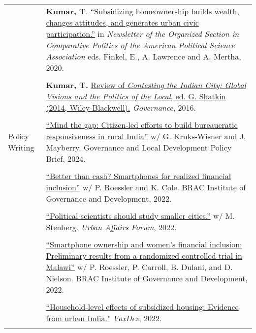 \documentclass[letterpaper, 10.5pt]{article}
\begin{document}
\begin{longtable}{p{1.5in}p{5in}}
& \textbf{Kumar, T}.
 \href{https://www.comparativepoliticsnewsletter.org/wp-content/uploads/2020/05/Spring-Newsletter-2020.pdf}{``Subsidizing homeownership builds wealth, changes attitudes, and generates urban civic participation.''} in \textit{Newsletter of the Organized Section in Comparative Politics of the American Political Science Association} eds. Finkel, E., A. Lawrence and A. Mertha, 2020. \\
&\\
& \textbf{Kumar, T.} \href{http://onlinelibrary.wiley.com/doi/10.1111/gove.12241/abstract}{Review of \textit{Contesting the Indian City: Global Visions and the Politics of the Local}, ed. G. Shatkin (2014, Wiley-Blackwell).} \textit{Governance}, 2016. 

\\

& \\


Policy Writing &
\href{https://gld.gu.se/media/tptdfltw/policy-brief-no26.pdf}{``Mind the gap: Citizen-led efforts to build bureaucratic
responsiveness in rural India''} w/ G. Kruks-Wisner and J. Mayberry. Governance and Local Development Policy Brief, 2024. \\

& \\

& \href{https://bigd.bracu.ac.bd/better-than-cash-smartphones-for-realized-financial-inclusion/}{``Better than cash? Smartphones for realized financial inclusion''} w/ P. Roessler and K. Cole. BRAC Institute of Governance and Development, 2022. \\
&\\

& \href{https://urbanaffairsreview.com/2022/10/11/why-political-scientists-should-study-smaller-cities/}{``Political scientists should study smaller cities.''} w/ M. Stenberg. \textit{Urban Affairs Forum}, 2022.\\
& \\
& \href{https://bigd.bracu.ac.bd/smartphone-ownership-and-pathways-to-womens-uptake-of-digital-financial-services-preliminary-results-from-a-randomized-controlled-trial-in-malawi/}{``Smartphone ownership and women’s financial inclusion: Preliminary results from a randomized controlled trial in Malawi''} w/ P. Roessler, P. Carroll, B. Dulani, and D. Nielson. BRAC Institute of Governance and Development, 2022.\\

& \\
& \href{https://voxdev.org/topic/infrastructure-urbanisation/household-level-effects-subsidised-housing-evidence-urban-india?utm_source=dlvr.it&utm_medium=twitter}{``Household-level effects of subsidized housing: Evidence from urban India."} \textit{VoxDev}, 2022.\\
& \\


\end{longtable}
\end{document}
